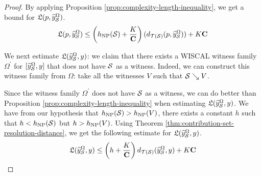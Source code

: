 \documentclass[12pt, reqno]{amsart}
\begin{document}
\begin{proof}
By applying Proposition \ref{prop:complexity-length-inequality}, we get a bound for $\mathfrak{L}(p, \widehat{y}_{\mathcal{S}}^{\Omega})$.
\begin{align}
  \label{eq:eq2}
  \mathfrak{L}(p, \widehat{y}_{\mathcal{S}}^{\Omega}) \leq \left( h_{\mathrm{NP}}(\mathcal{S}) + \frac{K}{\mathbf{C}} \right) (d_{\mathcal{T}(\mathcal{S})}(p, \widehat{y}_{\mathcal{S}}^{\Omega})) + K \mathbf{C}
\end{align}

We next estimate $\mathfrak{L}(\widehat{y}_{\mathcal{S}}^{\Omega}, y)$: we claim that there exists a WISCAL witness family $\Omega^{\prime}$ for $[\widehat{y}_{\mathcal{S}}^{\Omega}, y]$ that does not have $\mathcal{S}$ as a witness.
Indeed, we can construct this witness family from $\Omega$: take all the witnesses $V$ such that $\mathcal{S} \searrow V$.

Since the witness family $\Omega^{\prime}$ does not have $\mathcal{S}$ as a witness, we can do better than Proposition \ref{prop:complexity-length-inequality} when estimating $\mathfrak{L}(\widehat{y}_{\mathcal{S}}^{\Omega}, y)$.
We have from our hypothesis that $h_{\mathrm{NP}}(\mathcal{S}) > h_{\mathrm{NP}}(V)$, there exists a constant $h$ such that $h < h_{\mathrm{NP}}(\mathcal{S})$ but $h > h_{\mathrm{NP}}(V)$.
Using Theorem \ref{thm:contribution-set-resolution-distance}, we get the following estimate for $\mathfrak{L}(\widehat{y}_{\mathcal{S}}^{\Omega}, y)$.
\begin{align}
  \label{eq:eq3p}
\mathfrak{L}(\widehat{y}_{\mathcal{S}}^{\Omega}, y) \leq \left( h + \frac{K}{\mathbf{C}} \right) d_{\mathcal{T}(\mathcal{S})}(\widehat{y}_{\mathcal{S}}^{\Omega}, y) + K \mathbf{C}
\end{align}


\end{proof}
\end{document}
